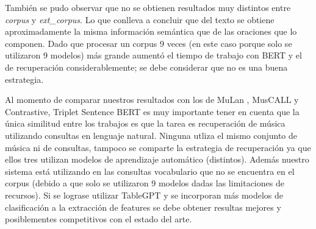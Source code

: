También se pudo observar que no se obtienen resultados muy distintos entre \textit{corpus} y \textit{ext\_corpus}. Lo que conlleva a concluir que del texto se obtiene aproximadamente la misma información semántica que de las oraciones que lo componen. Dado que procesar un corpus 9 veces (en este caso porque solo se utilizaron 9 modelos) más grande aumentó el tiempo de trabajo con BERT y el de recuperación considerablemente; se debe considerar que no es una buena estrategia. 

Al momento de comparar nuestros resultados con los de MuLan \cite{Huang2022MuLanAJ}, MusCALL \cite{Manco2022ContrastiveAL} y Contrastive, Triplet Sentence BERT \cite{Doh2022TowardUT} es muy importante tener en cuenta que la única similitud entre los trabajos es que la tarea es recuperación de música utilizando consultas en lenguaje natural. Ninguna utliza el mismo conjunto de música ni de consultas, tampoco se comparte la estrategia de recuperación ya que ellos tres utilizan modelos de aprendizaje automático (distintos). Además nuestro sistema está utilizando en las consultas vocabulario que no se encuentra en el corpus (debido a que solo se utilizaron 9 modelos dadas las limitaciones de recursos). Si se lograse utilizar TableGPT \cite{Gong2020TableGPTFT} y se incorporan más modelos de clasificación a la extracción de features se debe obtener resultas mejores y posiblementes competitivos con el estado del arte.
